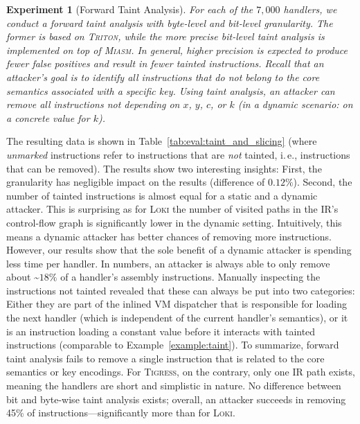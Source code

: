 \documentclass[letterpaper,twocolumn,10pt]{article}
\newcommand{\ie}{i.\,e.,\xspace}
\theoremstyle{customexample}
\theoremstyle{customexperiment}
\newtheorem{experiment}{Experiment}
\newcommand{\loki}{\textsc{Loki}\xspace}
\newcommand{\tigress}{\textsc{Tigress}\xspace}
\newcommand{\miasm}{\textsc{Miasm}\xspace}
\newcommand{\triton}{\textsc{Triton}\xspace}
\begin{document}
\begin{experiment}[Forward Taint Analysis]\label{experiment:taint_analysis}
For each of the $7,000$ handlers, we conduct a forward taint analysis with byte-level and bit-level granularity. The former is based on \triton, while the more precise bit-level taint analysis is implemented on top of \miasm. In general, higher precision is expected to produce fewer false positives and result in fewer tainted instructions. Recall that an attacker's goal is to identify all instructions that do not belong to the core semantics associated with a specific key. Using taint analysis, an attacker can remove all instructions not depending on $x$, $y$, $c$, or $k$ (in a dynamic scenario: on a \emph{concrete} value for $k$).\end{experiment}
The resulting data is shown in Table~\ref{tab:eval:taint_and_slicing} (where \emph{unmarked} instructions refer to instructions that are \emph{not} tainted, \ie instructions that can be removed).
The results show two interesting insights: First, the granularity has negligible impact on the results (difference of $0.12\%$).
Second, the number of tainted instructions is almost equal for a static and a dynamic attacker. This is surprising as for \loki the number of visited paths in the IR's control-flow graph is significantly lower in the dynamic setting. Intuitively, this means a dynamic attacker has better chances of removing more instructions. However, our results show that the sole benefit of a dynamic attacker is spending less time per handler.
In numbers, an attacker is always able to only remove about \textasciitilde$18\%$ of a handler's assembly instructions. Manually inspecting the instructions not tainted revealed that these can always be put into two categories: Either they are part of the inlined VM dispatcher that is responsible for loading the next handler (which is independent of the current handler's semantics), or it is an instruction loading a constant value before it interacts with tainted instructions (comparable to Example~\ref{example:taint}).
To summarize, forward taint analysis fails to remove a single instruction that is related to the core semantics or key encodings.
For \tigress, on the contrary, only one IR path exists, meaning the handlers are short and simplistic in nature. No difference between bit and byte-wise taint analysis exists; overall,  an attacker succeeds in removing 45\% of instructions---significantly more than for \loki.
\end{document}
